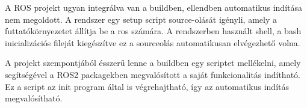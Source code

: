 A ROS projekt ugyan integrálva van a buildben, ellendben automatikus indítása nem
megoldott. A rendszer egy setup script source-olását igényli, amely a
futtatókörnyezetet állítja be a ros számára. A rendszerben használt shell, a bash
inicializációs fileját kiegészítve ez a sourceolás automatikusan elvégezhető
volna.

A projekt szempontjából ésszerű lenne a buildben egy scriptet mellékelni, amely
segítségével a ROS2 packagekben megvalósított a saját funkcionalitás
indítható. Ez a script az init program által is végrehajtható, így az automatikus
indítás megvalósítható.

